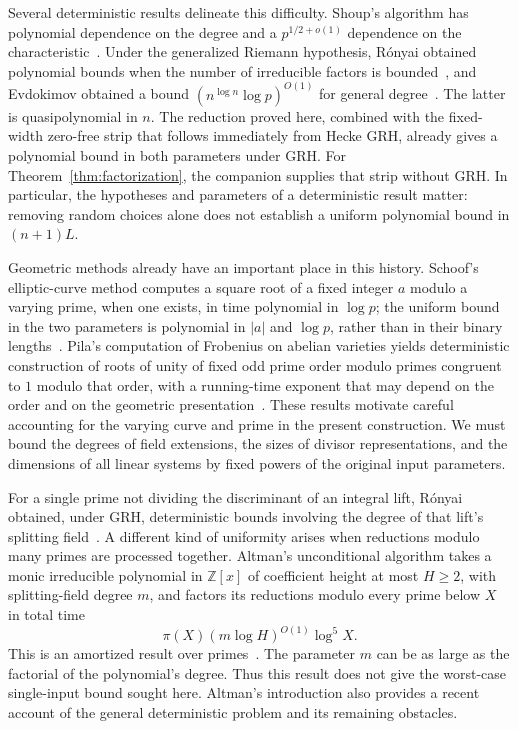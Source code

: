 Several deterministic results delineate this difficulty.  Shoup's algorithm
has polynomial dependence on the degree and a
$p^{1/2+o(1)}$ dependence on the characteristic~\cite{Shoup90}.
Under the generalized Riemann hypothesis, R\'onyai obtained polynomial
bounds when the number of irreducible factors is bounded~\cite{Ronyai88},
and Evdokimov obtained a bound
$(n^{\log n}\log p)^{O(1)}$ for general degree~\cite{Evdokimov94}.
The latter is quasipolynomial in $n$. The reduction proved here, combined
with the fixed-width zero-free strip that follows immediately from Hecke
GRH, already gives a polynomial bound in both parameters under GRH.
For Theorem~\ref{thm:factorization}, the companion supplies that strip
without GRH. In particular, the hypotheses and
parameters of a deterministic result matter: removing random choices
alone does not establish a uniform polynomial bound in $(n+1)L$.

Geometric methods already have an important place in this history.
Schoof's elliptic-curve method computes a square root of a fixed integer
$a$ modulo a varying prime, when one exists, in time polynomial in $\log p$; the uniform
bound in the two parameters is polynomial in $|a|$ and $\log p$, rather
than in their binary lengths~\cite[Section~4]{Schoof85}.
Pila's computation of Frobenius on abelian varieties yields deterministic
construction of roots of unity of fixed odd prime order modulo primes
congruent to $1$ modulo that order, with a running-time exponent that may
depend on the order and on the geometric
presentation~\cite[Theorems~A and~D]{Pila90}.  These results motivate
careful accounting for the varying curve and prime in the present
construction.  We must bound the degrees of field extensions, the sizes
of divisor representations, and the dimensions of all linear systems by
fixed powers of the original input parameters.

For a single prime not dividing the discriminant of an integral lift,
R\'onyai obtained, under GRH, deterministic bounds involving the degree
of that lift's splitting field~\cite{Ronyai92}.
A different kind of uniformity arises when reductions modulo many primes
are processed together.  Altman's unconditional algorithm takes
a monic irreducible polynomial in $\mathbb Z[x]$ of coefficient height
at most $H\ge2$, with splitting-field degree $m$, and factors its
reductions modulo every prime below $X$ in total time
\[
 \pi(X)(m\log H)^{O(1)}\log^5X.
\]
This is an amortized result over primes~\cite[Theorem~1.1]{Altman2025}.
The parameter $m$ can be as large as the factorial of the polynomial's
degree.  Thus this result does not give the worst-case single-input
bound sought here.  Altman's introduction also provides a recent account
of the general deterministic problem and its remaining obstacles.

